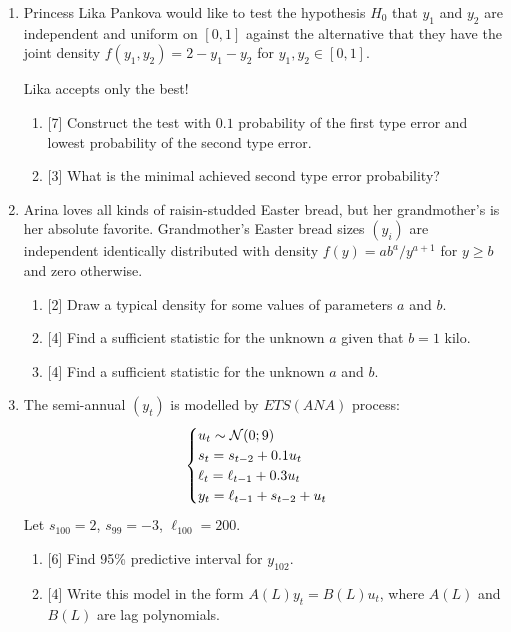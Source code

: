 \begin{enumerate}
    \newpage 

    \item Princess Lika Pankova would like to test the hypothesis $H_0$ that $y_1$ and $y_2$ are independent and uniform on $[0, 1]$ 
    against the alternative that they have the joint density $f(y_1, y_2) = 2 - y_1 - y_2$ for $y_1, y_2 \in [0, 1]$.
    
    Lika accepts only the best! 
    \begin{enumerate}
        \item {[7]} Construct the test with $0.1$ probability of the first type error and lowest probability of the second type error.
        \item {[3]} What is the minimal achieved second type error probability?
    \end{enumerate}
    
    \item Arina loves all kinds of raisin-studded Easter bread, but her grandmother's is her absolute favorite.
    Grandmother's Easter bread sizes $(y_i)$ are independent identically distributed with density 
    $f(y) = ab^a/y^{a+1}$ for $y \geq b$ and zero otherwise. 

    \begin{enumerate}
        \item {[2]} Draw a typical density for some values of parameters $a$ and $b$. 
        \item {[4]} Find a sufficient statistic for the unknown $a$ given that $b = 1$ kilo. 
        \item {[4]} Find a sufficient statistic for the unknown $a$ and $b$. 
    \end{enumerate}
    
    \item   The semi-annual $(y_t)$ is modelled by $ETS(ANA)$ process:
    \[
    \begin{cases}
        u_t \sim \mathcal{N}(0; 9) \\
        s_t = s_{t-2} + 0.1 u_t \\
        \ell_t = \ell_{t-1} + 0.3 u_t \\
        y_t = \ell_{t-1} + s_{t-2} + u_t \\
    \end{cases}    
    \]
    Let $s_{100} = 2$, $s_{99} = -3$, $\ell_{100} = 200$.
    \begin{enumerate}
      \item {[6]} Find 95\% predictive interval for $y_{102}$.
      \item {[4]} Write this model in the form $A(L) y_t = B(L) u_t$, where $A(L)$ and $B(L)$ are lag polynomials.
    \end{enumerate}
  
\end{enumerate}



